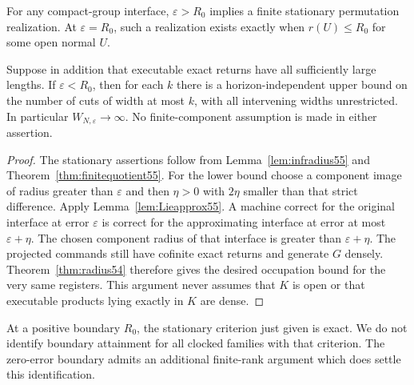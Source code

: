 \begin{theorem}\label{thm:profinite55}
For any compact-group interface, $\varepsilon>R_0$ implies a finite stationary permutation realization. At $\varepsilon=R_0$, such a realization exists exactly when $r(U)\le R_0$ for some open normal $U$.

Suppose in addition that executable exact returns have all sufficiently large lengths. If $\varepsilon<R_0$, then for each $k$ there is a horizon-independent upper bound on the number of cuts of width at most $k$, with all intervening widths unrestricted. In particular $W_{N,\varepsilon}\to\infty$. No finite-component assumption is made in either assertion.
\end{theorem}
\begin{proof}
The stationary assertions follow from Lemma~\ref{lem:infradius55} and Theorem~\ref{thm:finitequotient55}. For the lower bound choose a component image of radius greater than $\varepsilon$ and then $\eta>0$ with $2\eta$ smaller than that strict difference. Apply Lemma~\ref{lem:Lieapprox55}. A machine correct for the original interface at error $\varepsilon$ is correct for the approximating interface at error at most $\varepsilon+\eta$. The chosen component radius of that interface is greater than $\varepsilon+\eta$. The projected commands still have cofinite exact returns and generate $G$ densely. Theorem~\ref{thm:radius54} therefore gives the desired occupation bound for the very same registers. This argument never assumes that $K$ is open or that executable products lying exactly in $K$ are dense.
\end{proof}
At a positive boundary $R_0$, the stationary criterion just given is exact. We do not identify boundary attainment for all clocked families with that criterion. The zero-error boundary admits an additional finite-rank argument which does settle this identification.

